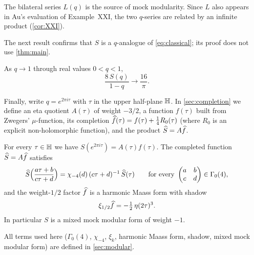 The bilateral series $L(q)$ is the source of mock modularity. Since $L$ also
appears in Au's evaluation of Example~XXI, the two $q$-series are related by an
infinite product (\cref{cor:XXI}).

The next result confirms that $S$ is a $q$-analogue of \eqref{eq:classical};
its proof does not use \cref{thm:main}.

\begin{proposition}\label{prop:classical}
As $q\to1$ through real values $0<q<1$,
\[
\frac{8\,S(q)}{1-q}\longrightarrow\frac{16}{\pi}.
\]
\end{proposition}

Finally, write $q=e^{2\pi i\tau}$ with $\tau$ in the upper half-plane $\mathbb{H}$.
In \cref{sec:completion} we define an eta quotient $A(\tau)$ of weight $-3/2$,
a function $f(\tau)$ built from Zwegers' $\mu$-function, its completion
$\widehat{f}(\tau)=f(\tau)+\frac14R_0(\tau)$ (where $R_0$ is an explicit
non-holomorphic function), and the product $\widehat{S}=A\widehat{f}$.

\begin{theorem}\label{thm:completion}
For every $\tau\in\mathbb{H}$ we have $S(e^{2\pi i\tau})=A(\tau)f(\tau)$. The completed
function $\widehat{S}=A\widehat{f}$ satisfies
\[
\widehat{S}\Big(\frac{a\tau+b}{c\tau+d}\Big)=\chi_{-4}(d)\,(c\tau+d)^{-1}\,\widehat{S}(\tau)
\qquad\text{for every }\begin{pmatrix}a&b\\c&d\end{pmatrix}\in\Gamma_0(4),
\]
and the weight-$1/2$ factor $\widehat{f}$ is a harmonic Maass form with shadow
\[
\xi_{1/2}\widehat{f}=-\tfrac12\,\eta(2\tau)^3 .
\]
In particular $S$ is a mixed mock modular form of weight $-1$.
\end{theorem}

All terms used here ($\Gamma_0(4)$, $\chi_{-4}$, $\xi_k$, harmonic Maass form,
shadow, mixed mock modular form) are defined in \cref{sec:modular}.

